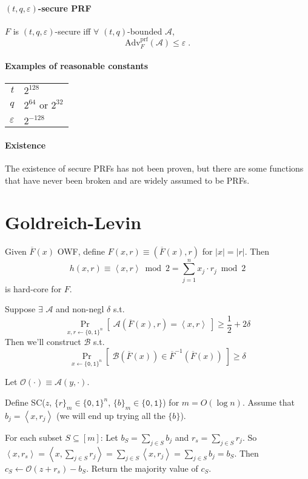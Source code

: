 \documentclass[11pt]{article}
\newcommand{\eqdef}{\ensuremath{\equiv}}
\newcommand{\eps}{\ensuremath{\varepsilon}}
\newcommand{\bit}{\ensuremath{\{\texttt{0},\texttt{1}\}}}
\newcommand{\ang}[1]{\ensuremath{\left\langle#1\right\rangle}}
\newcommand{\abs}[1]{{\ensuremath{\left\vert#1\right\vert}}}
\newcommand{\AAA}{\ensuremath{\mathcal{A}}}
\newcommand{\BBB}{\ensuremath{\mathcal{B}}}
\newcommand{\OOO}{\ensuremath{\mathcal{O}}}
\theoremstyle{remark}
\begin{document}
\paragraph{$(t,q,\eps)$-secure PRF}
$F$ is $(t,q,\eps)$-secure iff
$\forall$ $(t,q)$-bounded $\mathcal{A}$,
\[ \textrm{Adv}_F^\textrm{prf}(\mathcal{A}) \le \eps \;\textrm{.} \]

\paragraph{Examples of reasonable constants}
\begin{tabular}{r|l}
$t$ & $2^{128}$ \\
$q$ & $2^{64}$ or $2^{32}$ \\
$\eps$ & $2^{-128}$
\end{tabular}

\paragraph{Existence}
The existence of secure PRFs has not been proven,
but there are some functions that have never been
broken and are widely assumed to be PRFs.

\section{Goldreich-Levin}

Given $\overline{F}(x)$ OWF, define $F(x,r)\eqdef(\overline{F}(x), r)$ for $\abs{x}=\abs{r}$.
Then \[ h(x,r)\eqdef \ang{x,r} \bmod 2 = \sum_{j=1}^n x_j \cdot r_j \bmod 2 \]
is hard-core for $F$.

Suppose $\exists$ $\AAA$ and non-negl $\delta$ s.t. \[
\Pr_{x,r\gets\bit^n}[\;\AAA(\overline{F}(x), r) = \ang{x,r}\;] \ge \frac{1}{2} + 2\delta
\]
Then we'll construct $\BBB$ s.t. \[
\Pr_{x\gets\bit^n}[\;\BBB(\overline{F}(x)) \in \overline{F}^{-1}(\overline{F}(x))\;] \ge \delta
\]

Let $\OOO(\cdot) \eqdef \AAA(y, \cdot)$.

Define SC($z$, $\{r\}_m\in\bit^n$, $\{b\}_m\in\bit$) for $m = O(\log n)$.
Assume that $b_j=\ang{x,r_j}$ (we will end up trying all the $\{b\}$).

For each subset $S \subseteq [m]$: Let $b_S = \sum_{j\in S} b_j$ and $r_s = \sum_{j\in S} r_j$.
So $\ang{x,r_s} = \ang{x,\sum_{j\in S} r_j} = \sum_{j\in S}\ang{x,r_j} = \sum_{j\in S} b_j = b_S$.
Then $c_S \gets \OOO(z+r_s) - b_S$. Return the majority value of $c_S$.
\end{document}
